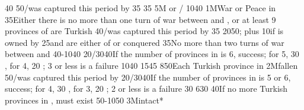{}{40}{}%
%
%
{}{50}{\provinceOsterreich/\villeVienne was captured this period by \TUR}%
%
%
{}{35}{}%
%
%
{}{35}{}%
%
\EUobjective5M{ or }{\COL/\TP}%
{10}{40}{\EU@objSpiceTUR}%
%
%
\EUobjective1M{War or Peace in \payshongrie}{}%
{}{35}{Either there is no more than one turn of war between \AUSaus and \TUR,
  or at least 9 provinces of \payshongrie are Turkish}%
%
%
{}{40}{\provinceOsterreich/\villeVienne was captured this period by \TUR}%
%
%
{}{35}{}%
%
%
{20}{50}{; plus 10\VPs if \provinceCyclades is owned by
  \paysmajeurTurquie}%
%
%
{}{25}{\paysvalachie and \paysmoldavie are either \VASSAL of \TUR or
  conquered}%
%
%
%
{}{35}{No more than two turns of war between \AUSaus and \TUR}%
%
%
{40-10}{40}{\EU@objPresidiosTUR}%
%
%
{20/30}{40}{If the number of provinces in \payscrimee is 6, success; for 5, 30
  \VPs, for 4, 20 \VPs; 3 or less is a failure}%
%
%
{10}{40}{}%
%
%
{15}{45}{\EU@objMonopolyZone}%
%
%
%
{8}{50}{Each Turkish province in \payshongrie}%
%
\EUobjective2M{\villeVienne fallen}{}%
{}{50}{\provinceOsterreich/\villeVienne was captured this period by \TUR}%
%
%
{20/30}{40}{If the number of provinces in \payscrimee is 5 or 6, success; for
  4, 30 \VPs, for 3, 20 \VPs; 2 or less is a failure}%
%
%
{}{30}{}%
%
%
{6}{30}{\EU@objSpiceTUR}%
%
%
%
%
{}{40}{If no more Turkish provinces in \payshongrie, \paystransylvanie must
  exist}%
%
%
%
{50-10}{50}{\EU@objPresidiosTUR}%
%
\EUobjective3M{\payscrimee intact*}{}%
